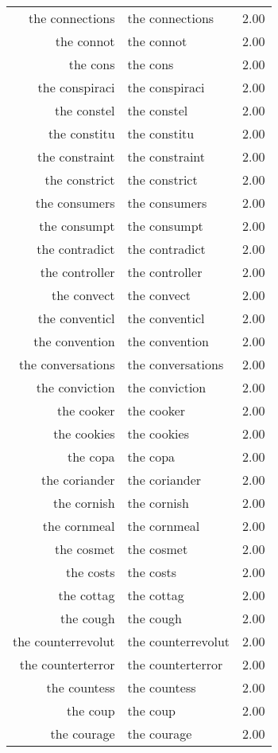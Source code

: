 \begin{table}[ht]
\begin{tabular}{rlr}
  the connections & the connections & 2.00 \\ 
  the connot & the connot & 2.00 \\ 
  the cons & the cons & 2.00 \\ 
  the conspiraci & the conspiraci & 2.00 \\ 
  the constel & the constel & 2.00 \\ 
  the constitu & the constitu & 2.00 \\ 
  the constraint & the constraint & 2.00 \\ 
  the constrict & the constrict & 2.00 \\ 
  the consumers & the consumers & 2.00 \\ 
  the consumpt & the consumpt & 2.00 \\ 
  the contradict & the contradict & 2.00 \\ 
  the controller & the controller & 2.00 \\ 
  the convect & the convect & 2.00 \\ 
  the conventicl & the conventicl & 2.00 \\ 
  the convention & the convention & 2.00 \\ 
  the conversations & the conversations & 2.00 \\ 
  the conviction & the conviction & 2.00 \\ 
  the cooker & the cooker & 2.00 \\ 
  the cookies & the cookies & 2.00 \\ 
  the copa & the copa & 2.00 \\ 
  the coriander & the coriander & 2.00 \\ 
  the cornish & the cornish & 2.00 \\ 
  the cornmeal & the cornmeal & 2.00 \\ 
  the cosmet & the cosmet & 2.00 \\ 
  the costs & the costs & 2.00 \\ 
  the cottag & the cottag & 2.00 \\ 
  the cough & the cough & 2.00 \\ 
  the counterrevolut & the counterrevolut & 2.00 \\ 
  the counterterror & the counterterror & 2.00 \\ 
  the countess & the countess & 2.00 \\ 
  the coup & the coup & 2.00 \\ 
  the courage & the courage & 2.00 \\ 

\end{tabular}
\end{table}
